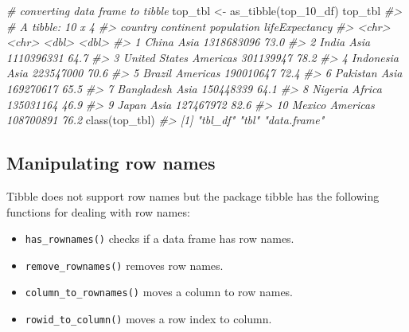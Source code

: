 \documentclass[
]{book}
\newenvironment{Shaded}{\begin{snugshade}}{\end{snugshade}}
\newcommand{\CommentTok}[1]{\textcolor[rgb]{0.56,0.35,0.01}{\textit{#1}}}
\newcommand{\FunctionTok}[1]{\textcolor[rgb]{0.00,0.00,0.00}{#1}}
\newcommand{\NormalTok}[1]{#1}
\newcommand{\OtherTok}[1]{\textcolor[rgb]{0.56,0.35,0.01}{#1}}
\providecommand{\tightlist}{%
  \setlength{\itemsep}{0pt}\setlength{\parskip}{0pt}}
\begin{document}
\begin{Shaded}
\begin{Highlighting}[]
\CommentTok{\# converting data frame to tibble}
\NormalTok{top\_tbl }\OtherTok{\textless{}{-}} \FunctionTok{as\_tibble}\NormalTok{(top\_10\_df)}
\NormalTok{top\_tbl}
\CommentTok{\#\textgreater{} \# A tibble: 10 x 4}
\CommentTok{\#\textgreater{}    country       continent population lifeExpectancy}
\CommentTok{\#\textgreater{}    \textless{}chr\textgreater{}         \textless{}chr\textgreater{}          \textless{}dbl\textgreater{}          \textless{}dbl\textgreater{}}
\CommentTok{\#\textgreater{}  1 China         Asia      1318683096           73.0}
\CommentTok{\#\textgreater{}  2 India         Asia      1110396331           64.7}
\CommentTok{\#\textgreater{}  3 United States Americas   301139947           78.2}
\CommentTok{\#\textgreater{}  4 Indonesia     Asia       223547000           70.6}
\CommentTok{\#\textgreater{}  5 Brazil        Americas   190010647           72.4}
\CommentTok{\#\textgreater{}  6 Pakistan      Asia       169270617           65.5}
\CommentTok{\#\textgreater{}  7 Bangladesh    Asia       150448339           64.1}
\CommentTok{\#\textgreater{}  8 Nigeria       Africa     135031164           46.9}
\CommentTok{\#\textgreater{}  9 Japan         Asia       127467972           82.6}
\CommentTok{\#\textgreater{} 10 Mexico        Americas   108700891           76.2}
\FunctionTok{class}\NormalTok{(top\_tbl)}
\CommentTok{\#\textgreater{} [1] "tbl\_df"     "tbl"        "data.frame"}
\end{Highlighting}
\end{Shaded}

\hypertarget{tr-row-names}{%
\subsection{Manipulating row names}\label{tr-row-names}}

Tibble does not support row names but the package tibble has the following functions for dealing with row names:

\begin{itemize}
\tightlist
\item
  \texttt{has\_rownames()} checks if a data frame has row names.
\item
  \texttt{remove\_rownames()} removes row names.
\item
  \texttt{column\_to\_rownames()} moves a column to row names.
\item
  \texttt{rowid\_to\_column()} moves a row index to column.
\end{itemize}
\end{document}
